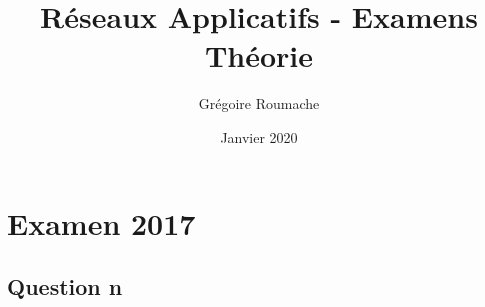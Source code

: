 \documentclass[a4paper]{article}
\title{Réseaux Applicatifs - Examens Théorie}
\author{Grégoire Roumache}
\date{Janvier 2020}
\begin{document}
\maketitle















\section{Examen 2017}










\subsection{Question n}
\end{document}
